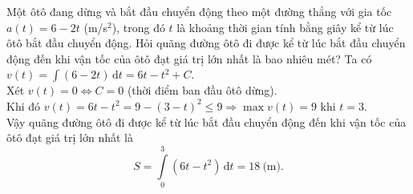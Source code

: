 \begin{bt}%

Một ôtô đang dừng và bắt đầu chuyển động theo một đường thẳng với gia tốc $a(t)=6-2t$ (m/s$^2$), trong đó $t$ là khoảng thời gian tính bằng giây kể từ lúc ôtô bắt đầu chuyển động. Hỏi quãng đường ôtô đi được kể từ lúc bắt đầu chuyển động đến khi vận tốc của ôtô đạt giá trị lớn nhất là bao nhiêu mét?
{}
\loigiai
{
Ta có $v(t)=\displaystyle\int\limits (6-2t)\mathrm{\,d}t=6t-t^2+C$. \\
Xét $v(t)=0 \Leftrightarrow C=0$ (thời điểm ban đầu ôtô dừng).\\
Khi đó $v(t)=6t-t^2=9-\left(3-t\right)^2\leq 9\Rightarrow \max v(t)=9$ khi $t=3$.\\
Vậy quãng đường ôtô đi được kể từ lúc bắt đầu chuyển động đến khi vận tốc của ôtô đạt giá trị lớn nhất là
\[S=\displaystyle\int\limits_{0}^{3} \left(6t-t^2\right)\mathrm{\,d}t=18 \ \text{(m)}.\]
}
\end{bt}

